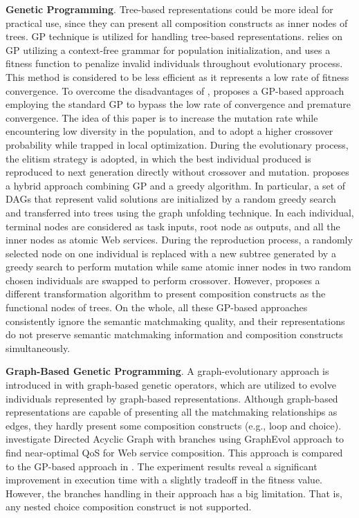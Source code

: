 \textbf{Genetic Programming}.
Tree-based representations could be more ideal for practical use, since they can present all composition constructs as inner nodes of trees. GP technique is utilized for handling tree-based representations. \cite {rodriguez2010composition} relies on GP utilizing a context-free grammar for population initialization, and uses a fitness function to penalize invalid individuals throughout evolutionary process. This method is considered to be less efficient as it represents a low rate of fitness convergence. To overcome the disadvantages of \cite {rodriguez2010composition}, \cite{yu2013adaptive} proposes a GP-based approach employing the standard GP to bypass the low rate of convergence and premature convergence. The idea of this paper is to increase the mutation rate while encountering low diversity in the population, and to adopt a higher crossover probability while trapped in local optimization.  During the evolutionary process, the elitism strategy is adopted, in which the best individual produced is reproduced to next generation directly without crossover and mutation. \cite{ma2015hybrid} proposes a hybrid approach combining GP and a greedy algorithm. In particular, a set of DAGs that represent valid solutions are initialized by a random greedy search and transferred into trees using the graph unfolding technique.  In each individual,  terminal nodes are considered as task inputs,  root node as  outputs, and all the inner nodes as atomic Web services. During the reproduction process,  a randomly selected node on one individual is replaced with a new subtree generated by a greedy search to perform mutation while same atomic inner nodes in two random chosen individuals are swapped to perform crossover. However, \cite{da2016genetic} proposes a different transformation algorithm to present composition constructs as the functional nodes of trees. On the whole, all these GP-based approaches \cite{ma2015hybrid,rodriguez2010composition,da2016genetic,yu2013adaptive} consistently ignore the semantic matchmaking quality, and their representations do not preserve semantic matchmaking information and composition constructs simultaneously. 

\textbf{Graph-Based Genetic Programming}.
A graph-evolutionary approach is introduced in \cite{da2015graphevol} with graph-based genetic operators, which are utilized to evolve individuals represented by graph-based representations. Although graph-based representations are capable of presenting all the matchmaking relationships as edges, they hardly present some composition constructs (e.g., loop and choice). \cite{da2016handling} investigate Directed Acyclic Graph with branches using GraphEvol approach \cite{da2015graphevol} to find near-optimal QoS for Web service composition. This approach is compared to the GP-based approach in \cite{da2015gp}. The experiment results reveal a significant improvement in execution time with a slightly tradeoff in the fitness value. However, the branches handling in their approach has a big limitation. That is, any nested choice composition construct is not supported.

